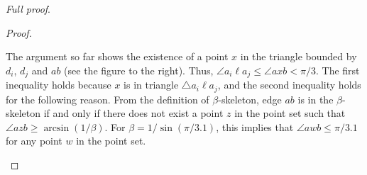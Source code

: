 \documentclass[final]{siamltex}
\newenvironment{fullproof}{\par{\it Full proof}. \ignorespaces}{\endproof}
\begin{document}
\begin{fullproof}
\begin{proof}
The argument so far shows the existence of a point $x$ in the triangle bounded by $d_i$, $d_j$ and $a b$ (see the figure to the right). 
Thus, $\angle{a_i \ell a_j} \le \angle{axb} < \pi/3$.
The first inequality holds because $x$ is in triangle $\triangle a_i \ell a_j$, 
and the second inequality holds for the following reason. From the definition of $\beta$-skeleton, edge $a b$ is in the $\beta$-skeleton 
if and only if there does not exist a point $z$
in the point set such that $\angle a z b \ge \arcsin(1/\beta)$. For $\beta = 1/\sin (\pi/3.1)$, this implies that
$\angle a w b \le \pi/3.1$ for any point $w$ in the point set. 


\end{window}
\end{proof}
\end{fullproof}
\end{document}

